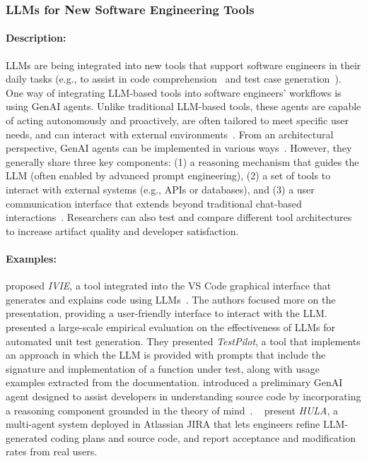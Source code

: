 \documentclass[smallextended]{svjour3}
\newcommand{\studytypesubsection}[1]{\subsubsection{#1}}
\newcommand{\studytypeparagraph}[1]{\paragraph{\bfseries #1:}}
\newcommand{\studytypesubsection}[1]{\subsection{#1}}
\newcommand{\studytypeparagraph}[1]{\subsubsection{#1}}
\begin{document}
\studytypesubsection{LLMs for New Software Engineering Tools}
\label{sec:llms-for-new-software-engineering-tools}

\studytypeparagraph{Description}

LLMs are being integrated into new tools that support software engineers in their daily tasks (e.g., to assist in code comprehension~\cite{DBLP:conf/chi/YanHWH24} and test case generation~\cite{DBLP:journals/tse/SchaferNET24}).
One way of integrating LLM-based tools into software engineers' workflows is using GenAI agents.
Unlike traditional LLM-based tools, these agents are capable of acting autonomously and proactively, are often tailored to meet specific user needs, and can interact with external environments~\cite{wiesinger2025agents,yang2025code}.
From an architectural perspective, GenAI agents can be implemented in various ways~\cite{wiesinger2025agents}.
However, they generally share three key components: (1) a reasoning mechanism that guides the LLM (often enabled by advanced prompt engineering), (2) a set of tools to interact with external systems (e.g., APIs or databases), and (3) a user communication interface that extends beyond traditional chat-based interactions~\cite{DBLP:journals/tmlr/SumersYN024, DBLP:journals/corr/abs-2309-07870}.
Researchers can also test and compare different tool architectures to increase artifact quality and developer satisfaction.

\studytypeparagraph{Examples}

\citeauthor{DBLP:conf/chi/YanHWH24} proposed \emph{IVIE}, a tool integrated into the VS Code graphical interface that generates and explains code using LLMs~\cite{DBLP:conf/chi/YanHWH24}.
The authors focused more on the presentation, providing a user-friendly interface to interact with the LLM. 
\citeauthor{DBLP:journals/tse/SchaferNET24}~\cite{DBLP:journals/tse/SchaferNET24} presented a large-scale empirical evaluation on the effectiveness of LLMs for automated unit test generation.
They presented \emph{TestPilot}, a tool that implements an approach in which the LLM is provided with prompts that include the signature and implementation of a function under test, along with usage examples extracted from the documentation.
\citeauthor{DBLP:conf/icsm/RichardsW24} introduced a preliminary GenAI agent designed to assist developers in understanding source code by incorporating a reasoning component grounded in the theory of mind~\cite{DBLP:conf/icsm/RichardsW24}.
\citeauthor{DBLP:conf/icse-seip/TakerngsaksiriPTTZJLCCW25}~\cite{DBLP:conf/icse-seip/TakerngsaksiriPTTZJLCCW25} present \emph{HULA}, a multi-agent system deployed in Atlassian JIRA that lets engineers refine LLM-generated coding plans and source code, and report acceptance and modification rates from real users.
 
\end{document}
